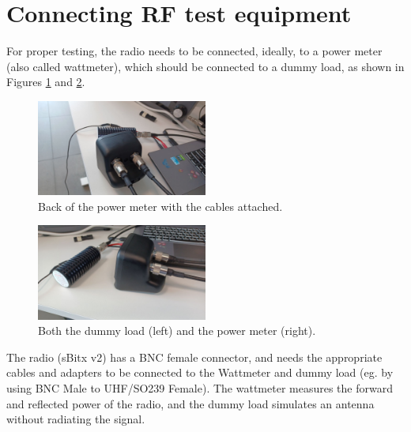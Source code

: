 \documentclass[11pt,a4paper]{article}
\begin{document}





\section{Connecting RF test equipment}

For proper testing, the radio needs to be connected, ideally, to a power meter (also called wattmeter), which should be connected to a dummy load, as shown in Figures \ref{fig:backview1} and \ref{fig:backview3}.

\begin{figure}[H]
  \centering
  \includegraphics[width=0.5\textwidth]{pictures/wattmeter_1.jpeg}
  \caption{Back of the power meter with the cables attached.}
  \label{fig:backview1}
\end{figure}

\begin{figure}[H]
  \centering
  \includegraphics[width=0.5\textwidth]{pictures/wattmeter_3.jpeg}
  \caption{Both the dummy load (left) and the power meter (right).}
  \label{fig:backview3}
\end{figure}


The radio (sBitx v2) has a BNC female connector, and needs the appropriate cables and adapters to
be connected to the Wattmeter and dummy load (eg. by using BNC Male to UHF/SO239 Female). The wattmeter measures the forward and reflected power of the radio,
and the dummy load simulates an antenna without radiating the signal.
\end{document}
